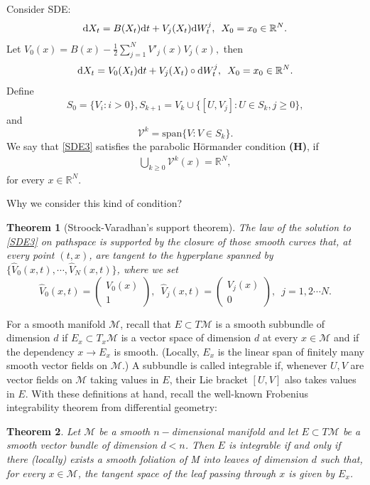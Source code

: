 \documentclass[twoside, 12pt]{book}
\numberwithin{equation}{chapter}
\newtheorem{theorem}{Theorem}[section]
\def\cM{{\mathcal M}}
\def\mR{{\mathbb R}}
\def\sV{{\mathscr V}}
\def\geq{\geqslant}
\def\d{\text{\rm{d}}}
\begin{document}
	Consider SDE: 
	\begin{align}\label{SDE2}
		\d X_t =B(X_t)\d t+V_j (X_t) \d W^j_t, \,\,\, X_0=x_0\in \mR^N. 
	\end{align}
	Let $V_0(x)=B(x)-\frac{1}{2} \sum_{j=1}^N V'_j(x)V_j(x), $ then
	\begin{align}\label{SDE3}
		\d X_t =V_0(X_t)\d t+V_j (X_t)\circ \d W^j_t, \,\,\, X_0=x_0\in \mR^N. 
	\end{align}
	Define 
	$$S_0=\{V_i : i>0\}, S_{k+1}=V_k\cup \{[U,V_j]: U\in S_k, j\geq 0\}, $$
	and 
	$$\sV^k=\mbox{span} \{V: V\in S_k\}. $$
	We say that \eqref{SDE3} satisfies the parabolic H\"ormander condition 
	\textbf{(H)}, if    \begin{align}\label{H}\bigcup_{k\geq 0} \sV^k(x) = \mR^N, \end{align} for every $x \in \mR^N.$ 
	
	Why we consider this kind of condition? 
	
	\begin{theorem}[Stroock-Varadhan's support theorem]
		The law of the solution to \eqref{SDE3} on pathspace is supported by the closure of those smooth curves that, at every point $(t, x)$, are tangent to the hyperplane spanned by $\{\hat{V}_0(x,t), \cdots , \hat{V}_N(x,t)\}$, where we set 
		$$\hat{V}_0(x,t)=\begin{pmatrix} V_0(x)\\ 1 \end{pmatrix},  \,\,\, \hat{V}_j(x,t)=\begin{pmatrix} V_j(x)\\ 0 \end{pmatrix}, \,\,\, j=1,2\cdots N. $$
	\end{theorem}
	
	
	
	For a smooth manifold $\cM$, recall that $E \subset T\cM$ is a smooth subbundle of dimension $d$ if $E_x \subset T_x\cM$ is a vector space of dimension $d$ at every $x \in \cM$ and if the dependency $x \to E_x$ is smooth. (Locally, $E_x$ is the linear span of finitely many smooth vector fields on $\cM$.) A subbundle is called integrable if, whenever $U, V$ are vector fields on $\cM$ taking values in $E$, their Lie bracket $[U, V ]$ also takes values in $E$.
	With these definitions at hand, recall the well-known Frobenius integrability theorem from differential geometry:
	\begin{theorem}
		Let $\cM $ be a smooth $n-$dimensional manifold and let $E \subset T \cM$ be a smooth vector bundle of dimension $d < n$. Then $E $ is integrable if and only if there (locally) exists a smooth foliation of M into leaves of dimension $d$ such that, for every $x\in  \cM$, the tangent space of the leaf passing through $x$ is given by $E_x$.
		
	\end{theorem}
	
\end{document}
